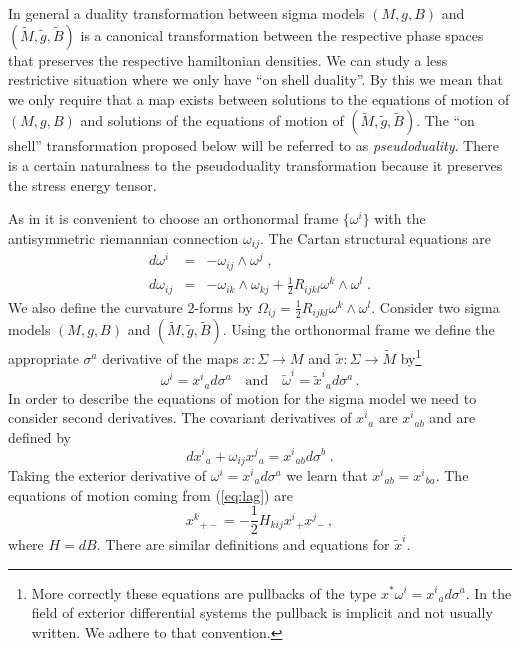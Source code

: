 \documentclass[a4paper,12pt]{article}
\newcommand{\Btil}{\widetilde{B}}
\newcommand{\Mtil}{\widetilde{M}}
\newcommand{\gtil}{\tilde{g}}
\newcommand{\half}{\frac{1}{2}}
\newcommand{\omegatil}{\tilde{\omega}}
\newcommand{\xtil}{\tilde{x}}
\begin{document}
In general a duality transformation between sigma models $(M,g,B)$ and
$(\Mtil,\gtil,\Btil)$ is a canonical transformation between the
respective phase spaces that preserves the respective hamiltonian
densities.  We can study a less restrictive situation where we only
have ``on shell duality''.  By this we mean that we only require that
a map exists between solutions to the equations of motion of $(M,g,B)$
and solutions of the equations of motion of $(\Mtil,\gtil,\Btil)$. 
The ``on shell'' transformation proposed below will be
referred to as \emph{pseudoduality}.  There is a certain naturalness
to the pseudoduality transformation because it preserves the stress
energy tensor.

As in \cite{Alvarez:2000bh} it is convenient to choose an orthonormal
frame $\{\omega^{i}\}$ with the antisymmetric riemannian connection
$\omega_{ij}$.  The Cartan structural equations are
\begin{eqnarray*}
    d\omega^{i} & = & -\omega_{ij}\wedge\omega^{j}\;, \\
    d\omega_{ij} & = & -\omega_{ik}\wedge\omega_{kj}
    +\half R_{ijkl}\omega^{k}\wedge\omega^{l}\;.
\end{eqnarray*}
We also define the curvature $2$-forms by $\Omega_{ij} = \half
R_{ijkl}\omega^{k}\wedge\omega^{l}$.  Consider two sigma models
$(M,g,B)$ and $(\Mtil,\gtil,\Btil)$.  Using the orthonormal frame we
define the appropriate $\sigma^{a}$ derivative of the maps
$x:\Sigma\to M$ and $\xtil:\Sigma \to \Mtil$ by\footnote{More
correctly these equations are pullbacks of the type $x^{*}\omega^{i}=
x^{i}{}_{a} d\sigma^{a}$.  In the field of exterior differential
systems \cite{BCG3} the pullback is implicit and not usually written. 
We adhere to that convention.}
\begin{equation}
    \omega^{i}=x^{i}{}_{a}d\sigma^{a}\quad\mbox{and}\quad
    \omegatil^{i}=\xtil^{i}{}_{a}d\sigma^{a}\,.
    \label{eq:defvel}
\end{equation}
In order to describe the equations of motion for the sigma model we
need to consider second derivatives.  The covariant derivatives of
$x^{i}{}_{a}$ are $x^{i}{}_{ab}$ and are defined by
\begin{equation}
    dx^{i}{}_{a} + \omega_{ij}x^{j}{}_{a} = x^{i}{}_{ab}d\sigma^{b}\;.
    \label{eq:covder}
\end{equation}
Taking the exterior derivative of $\omega^{i}=x^{i}{}_{a}d\sigma^{a}$
we learn that $x^{i}{}_{ab}= x^{i}{}_{ba}$.  The equations of motion
coming from (\ref{eq:lag}) are
\begin{equation}
    x^{k}{}_{+-} = -\half H_{kij}x^{i}{}_{+} x^{j}{}_{-}\,,
    \label{eq:eomgen}
\end{equation}
where $H=dB$.  There are similar definitions and equations for
$\xtil^{i}$.
\end{document}
